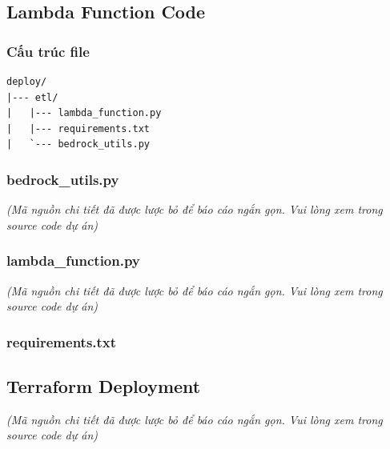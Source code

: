 \hypertarget{lambda-function-code}{%
\subsection{Lambda Function Code}}

\hypertarget{cux1ea5u-truxfac-file}{%
\subsubsection{Cấu trúc file}}

\begin{verbatim}
deploy/
|--- etl/
|   |--- lambda_function.py
|   |--- requirements.txt
|   `--- bedrock_utils.py
\end{verbatim}

\hypertarget{bedrock_utils.py}{%
\subsubsection{bedrock\_utils.py}}

\emph{(Mã nguồn chi tiết đã được lược bỏ để báo cáo ngắn gọn. Vui lòng
xem trong source code dự án)}

\hypertarget{lambda_function.py}{%
\subsubsection{lambda\_function.py}}

\emph{(Mã nguồn chi tiết đã được lược bỏ để báo cáo ngắn gọn. Vui lòng
xem trong source code dự án)}

\hypertarget{requirements.txt}{%
\subsubsection{requirements.txt}}

\begin{Shaded}
\begin{Highlighting}[]
\end{Highlighting}
\end{Shaded}

\hypertarget{terraform-deployment}{%
\subsection{Terraform Deployment}}

\emph{(Mã nguồn chi tiết đã được lược bỏ để báo cáo ngắn gọn. Vui lòng
xem trong source code dự án)}

